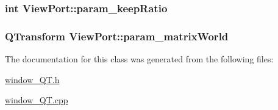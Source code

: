 \hypertarget{classViewPort_a2ad627e7c8f030da5b252cfbb056164b}{
\subsubsection[{param\-\_\-keep\-Ratio}]{\setlength{\rightskip}{0pt plus 5cm}int View\-Port\-::param\-\_\-keep\-Ratio}}\label{classViewPort_a2ad627e7c8f030da5b252cfbb056164b}
\hypertarget{classViewPort_a4404db6e34a91d2e2e4c5026840a2adc}{
\subsubsection[{param\-\_\-matrix\-World}]{\setlength{\rightskip}{0pt plus 5cm}Q\-Transform View\-Port\-::param\-\_\-matrix\-World}}\label{classViewPort_a4404db6e34a91d2e2e4c5026840a2adc}


The documentation for this class was generated from the following files\-:\begin{DoxyCompactItemize}
\item 
\hyperlink{window__QT_8h}{window\-\_\-\-Q\-T.\-h}\item 
\hyperlink{window__QT_8cpp}{window\-\_\-\-Q\-T.\-cpp}\end{DoxyCompactItemize}
